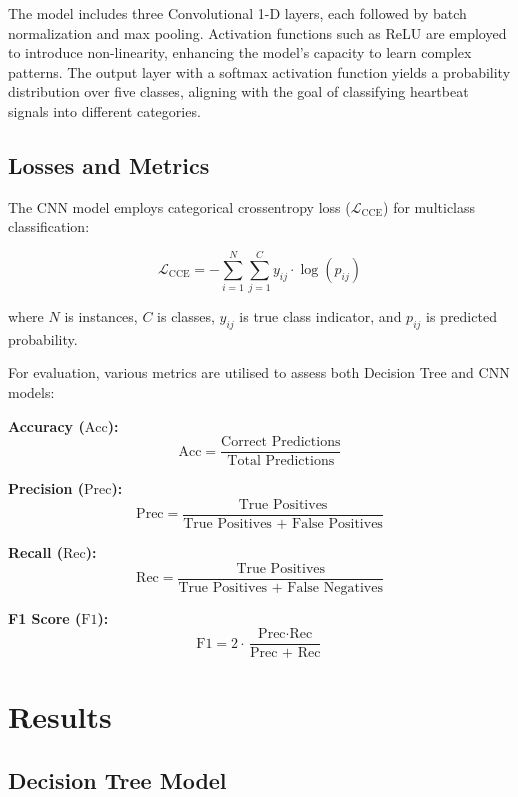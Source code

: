 \documentclass[]{acmsiggraph}
\begin{document}
The model includes three Convolutional 1-D layers, each followed by batch normalization and max pooling. Activation functions such as ReLU are employed to introduce non-linearity, enhancing the model's capacity to learn complex patterns. The output layer with a softmax activation function yields a probability distribution over five classes, aligning with the goal of classifying heartbeat signals into different categories.

\subsection{Losses and Metrics}

The CNN model employs categorical crossentropy loss (\(\mathcal{L}_{\text{CCE}}\)) for multiclass classification:

\[
\mathcal{L}_{\text{CCE}} = - \sum_{i=1}^{N} \sum_{j=1}^{C} y_{ij} \cdot \log(p_{ij})
\]

where \(N\) is instances, \(C\) is classes, \(y_{ij}\) is true class indicator, and \(p_{ij}\) is predicted probability.

For evaluation, various metrics are utilised to assess both Decision Tree and CNN models:

\textbf{Accuracy (\(\text{Acc}\)):}
\[
\text{Acc} = \frac{\text{Correct Predictions}}{\text{Total Predictions}}
\]

\textbf{Precision (\(\text{Prec}\)):}
\[
\text{Prec} = \frac{\text{True Positives}}{\text{True Positives + False Positives}}
\]

\textbf{Recall (\(\text{Rec}\)):}
\[
\text{Rec} = \frac{\text{True Positives}}{\text{True Positives + False Negatives}}
\]

\textbf{F1 Score (\(\text{F1}\)):}
\[
\text{F1} = 2 \cdot \frac{\text{Prec} \cdot \text{Rec}}{\text{Prec + Rec}}
\]
\section{Results} \label{sec:overview}

\subsection{Decision Tree Model}
\end{document}
